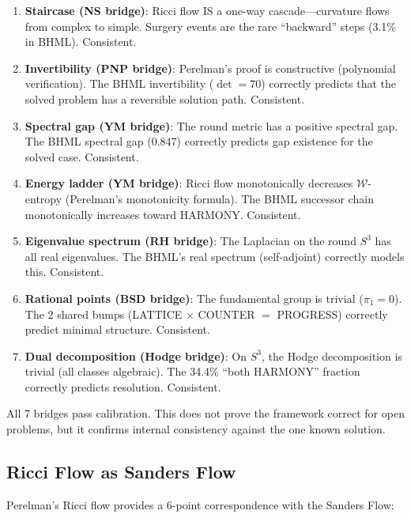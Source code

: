 \documentclass[11pt]{article}
\begin{document}
\begin{enumerate}
\item \textbf{Staircase (NS bridge)}: Ricci flow IS a one-way cascade---curvature flows from complex to simple. Surgery events are the rare ``backward'' steps (3.1\% in BHML). Consistent.
\item \textbf{Invertibility (PNP bridge)}: Perelman's proof is constructive (polynomial verification). The BHML invertibility ($\det = 70$) correctly predicts that the solved problem has a reversible solution path. Consistent.
\item \textbf{Spectral gap (YM bridge)}: The round metric has a positive spectral gap. The BHML spectral gap (0.847) correctly predicts gap existence for the solved case. Consistent.
\item \textbf{Energy ladder (YM bridge)}: Ricci flow monotonically decreases $\mathcal{W}$-entropy (Perelman's monotonicity formula). The BHML successor chain monotonically increases toward HARMONY. Consistent.
\item \textbf{Eigenvalue spectrum (RH bridge)}: The Laplacian on the round $S^3$ has all real eigenvalues. The BHML's real spectrum (self-adjoint) correctly models this. Consistent.
\item \textbf{Rational points (BSD bridge)}: The fundamental group is trivial ($\pi_1 = 0$). The 2 shared bumps (LATTICE $\times$ COUNTER $=$ PROGRESS) correctly predict minimal structure. Consistent.
\item \textbf{Dual decomposition (Hodge bridge)}: On $S^3$, the Hodge decomposition is trivial (all classes algebraic). The 34.4\% ``both HARMONY'' fraction correctly predicts resolution. Consistent.
\end{enumerate}

All 7 bridges pass calibration. This does not prove the framework correct for open problems, but it confirms internal consistency against the one known solution.

\subsection{Ricci Flow as Sanders Flow}
\label{subsec:ricci-sanders}

Perelman's Ricci flow provides a 6-point correspondence with the Sanders Flow:
\end{document}
